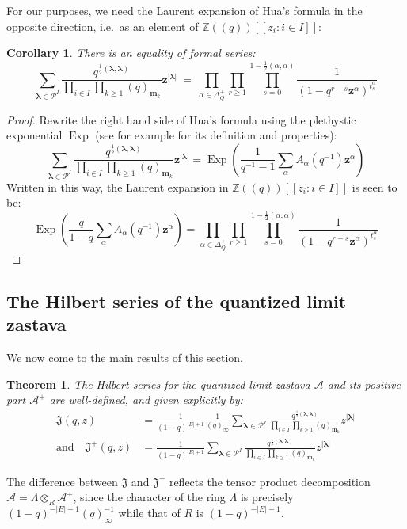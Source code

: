 \documentclass[11pt,reqno]{amsart}
\renewcommand{\mathbf}{\mathbold}
\numberwithin{equation}{section}
\newtheorem{Theorem}[equation]{Theorem}
\newtheorem{Corollary}[equation]{Corollary}
\theoremstyle{definition}
\newcommand{\cA}{\mathcal{A}}
\newcommand{\fJ}{\mathfrak{J}}
\newcommand{\cP}{\mathcal{P}}
\newcommand{\bm}{\mathbf{m}}
\newcommand{\bz}{\mathbf{z}}
\newcommand{\ZZ}{\mathbb{Z}}
\newcommand{\vertexset}{I}
\newcommand{\arrowset}{E}
\newcommand{\GT}{\Lambda}
\newcommand{\base}{R}
\newcommand{\Partitions}{\cP}
\newcommand{\bla}{{\boldsymbol{\lambda}}}
\newcommand{\qzast}{\cA}
\newcommand{\qzastplus}{\cA^{+}}
\begin{document}
For our purposes, we need the Laurent expansion of Hua's formula in the opposite direction, i.e.~as an element of $\ZZ(\!(q)\!)[\![z_i : i \in \vertexset]\!]$:
\begin{Corollary}
    \label{cor: version of Hua}
    There is an equality of formal series:
    $$
    \sum_{\bla \in \Partitions^\vertexset} \frac{q^{\frac{1}{2}(\bla, \bla)}}{\prod_{i\in \vertexset} \prod_{k\geq 1} (q)_{\bm_k} }\bz^{|\bla|} \ = \ \prod_{\alpha \in \Delta_Q^+} \prod_{r \geq 1} \prod_{s = 0}^{1 - \frac{1}{2}(\alpha,\alpha)}\frac{1}{(1-q^{r-s} \bz^\alpha)^{t^\alpha_s}}
    $$
\end{Corollary}


\begin{proof}
    Rewrite  the right hand side of Hua's formula using the plethystic exponential $\operatorname{Exp}$ (see for example \cite[Appendix A]{Mozgovoy} for its definition and properties):
    $$
    \sum_{\bla \in \Partitions^\vertexset} \frac{q^{\frac{1}{2}(\bla, \bla)}}{\prod_{i\in \vertexset} \prod_{k\geq 1} (q)_{\bm_k} }\bz^{|\bla|} = \operatorname{Exp}\left( \frac{1}{q^{-1}-1}\sum_\alpha A_\alpha(q^{-1}) \bz^\alpha \right)
    $$
    Written in this way, the Laurent expansion in $\ZZ(\!(q)\!)[\![z_i : i \in \vertexset]\!]$  is seen to be:
    $$
    \operatorname{Exp}\left( \frac{q}{1-q}\sum_\alpha A_\alpha(q^{-1}) \bz^\alpha \right) = \prod_{\alpha \in \Delta^+_Q} \prod_{r \geq 1 } \prod_{s=0}^{1 - \frac{1}{2}(\alpha,\alpha)} \frac{1}{(1-q^{r-s}\bz^\alpha)^{t^\alpha_s}}
    $$
\end{proof}

\subsection{The Hilbert series of the quantized limit zastava}
\label{ssec:hilb-for-limit-zastava}
We now come to the main results of this section. 
\begin{Theorem}
The Hilbert series for the quantized limit zastava $\qzast$  and its positive part  $\qzastplus$ are well-defined, and given explicitly by:
\begin{align*}
\fJ(q,z) &=  \frac{1}{(1-q)^{|\arrowset|+1}}  \frac{1}{(q)_{\boldsymbol{\infty}}}\sum_{\bla \in \Partitions^\vertexset} \frac{q^{\frac{1}{2}(\bla, \bla)}}{\prod_{i\in \vertexset} \prod_{k\geq 1} (q)_{\bm_k} }z^{|\bla|}   \\
\text{and} \quad \fJ^+(q,z) &=\frac{1}{(1-q)^{|\arrowset|+1}} \sum_{\bla \in \Partitions^\vertexset} \frac{q^{\frac{1}{2}(\bla, \bla)}}{\prod_{i\in \vertexset} \prod_{k\geq 1} (q)_{\bm_k} }z^{|\bla|}
\end{align*}
\end{Theorem}
The difference between $\fJ$ and $\fJ^+$ reflects the tensor product decomposition $\qzast = \GT \otimes_\base \qzastplus$, since the character of the ring $\GT$ is precisely $(1-q)^{-|\arrowset|-1} (q)_{\boldsymbol{\infty}}^{-1}$ while that of $\base $ is $(1-q)^{-|\arrowset|-1}$.
\end{document}
